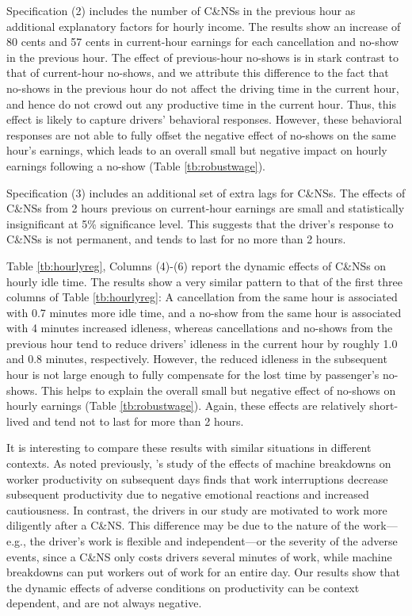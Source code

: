\documentclass[reviewmode]{AEA}
\begin{document}
Specification (2) includes the number of C\&NSs in the previous hour as additional explanatory factors for hourly income. The results show an increase of 80 cents and 57 cents in current-hour earnings for each cancellation and no-show in the previous hour. The effect of previous-hour no-shows is in stark contrast to that of current-hour no-shows, and we attribute this difference to the fact that no-shows in the previous hour do not affect the driving time in the current hour, and hence do not crowd out any productive time in the current hour. Thus, this effect is likely to capture drivers' behavioral responses. However, these behavioral responses are not able to fully offset the negative effect of no-shows on the same hour's earnings, which leads to an overall small but negative impact on hourly earnings following a no-show (Table \ref{tb:robustwage}).

Specification (3) includes an additional set of extra lags for C\&NSs. The effects of C\&NSs from 2 hours previous on current-hour earnings are small and statistically insignificant at 5\% significance level. This suggests that the driver's response to C\&NSs is not permanent, and tends to last for no more than 2 hours.

Table \ref{tb:hourlyreg}, Columns (4)-(6) report the dynamic effects of C\&NSs on hourly idle time. The results show a very similar pattern to that of the first three columns of Table \ref{tb:hourlyreg}: A cancellation from the same hour is associated with 0.7 minutes more idle time, and a no-show from the same hour is associated with 4 minutes increased idleness, whereas cancellations and no-shows from the previous hour tend to reduce drivers' idleness in the current hour by roughly 1.0 and 0.8 minutes, respectively. However, the reduced idleness in the subsequent hour is not large enough to fully compensate for the lost time by passenger's no-shows. This helps to explain the overall small but negative effect of no-shows on hourly earnings (Table \ref{tb:robustwage}).  Again, these effects are relatively short-lived and tend not to last for more than 2 hours.

It is interesting to compare these results with similar situations in different contexts. As noted previously, \citeauthor{cai2017recover}'s \citeyear{cai2017recover} study of the effects of  machine breakdowns on worker productivity on subsequent days finds that work interruptions decrease subsequent productivity due to negative emotional reactions and increased cautiousness. In contrast, the drivers in our study are motivated to work more diligently after a C\&NS. This difference may be due to the nature of the work---e.g., the driver's work is flexible and independent---or the severity of the adverse events, since a C\&NS only costs drivers several minutes of work, while machine breakdowns can put workers out of work for an entire day. Our results show that the dynamic effects of adverse conditions on productivity can be context dependent, and are not always negative.
\end{document}
